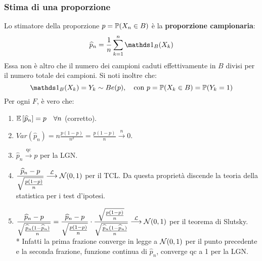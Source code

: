 \subsubsection{Stima di una proporzione}
Lo stimatore della proporzione $p = \mathbb P(X_n \in B)$ è la \textbf{proporzione campionaria}:
$$\widehat p_n = \frac 1 n \sum_{k=1}^n \Ind_B(X_k)$$
Essa non è altro che il numero dei campioni caduti effettivamente in $B$ divisi per il numero totale dei campioni. Si noti inoltre che:
$$ \Ind_B(X_k) = Y_k \sim Be(p), \quad \text{con } p = \PP(X_k \in B) = \PP(Y_k = 1)$$
Per ogni $F$, è vero che:
\begin{enumerate}
  \item $\mathbb E \left[ \widehat p_n \right] = p \quad \forall n$ (corretto).
  \item $Var(\widehat p_n) = n \frac{p(1-p)}{n^2} = \frac{p(1-p)} n \stackrel{n}{\longrightarrow} 0$.
  \item $\widehat p_n \stackrel{\text{qc}}{\longrightarrow} p$ per la LGN.
  \item $\dfrac{\widehat p_n - p}{\sqrt{ \frac{p(1-p)} n }} \stackrel{\mathcal L}{\longrightarrow} \mathcal N(0,1)$ per il TCL. Da questa proprietà discende la teoria della statistica per i test d'ipotesi.
  \item  $\dfrac{\widehat p_n - p}{\sqrt{ \frac{\widehat p_n(1-\widehat p_n)} n }} = \dfrac{\widehat p_n - p}{\sqrt{ \frac{p(1-p)} n }} \cdot \dfrac{\sqrt{ \frac{p(1-p)} n }}{\sqrt{ \frac{\widehat p_n(1-\widehat p_n)} n }} \stackrel{\mathcal L}{\longrightarrow} \mathcal N(0,1)$ per il teorema di Slutsky. \\*
  Infatti la prima frazione converge in legge a $\mathcal N(0,1)$ per il punto precedente e la seconda frazione, funzione continua di $\widehat p_n$, converge qc a 1 per la LGN.
\end{enumerate}

